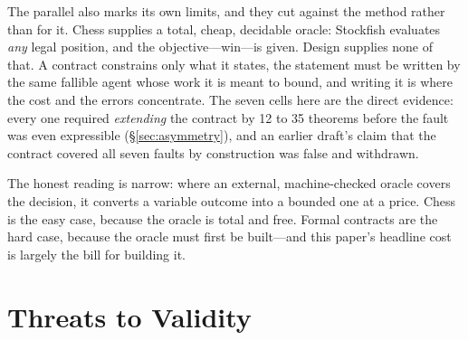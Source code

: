 \documentclass[runningheads]{llncs}
\begin{document}
The parallel also marks its own limits, and they cut against the method rather
than for it. Chess supplies a total, cheap, decidable oracle: Stockfish evaluates
\emph{any} legal position, and the objective---win---is given. Design supplies
none of that. A contract constrains only what it states, the statement must be
written by the same fallible agent whose work it is meant to bound, and writing
it is where the cost and the errors concentrate. The seven cells here are the
direct evidence: every one required \emph{extending} the contract by 12 to 35
theorems before the fault was even expressible (\S\ref{sec:asymmetry}), and an
earlier draft's claim that the contract covered all seven faults by construction
was false and withdrawn.

The honest reading is narrow: where an external, machine-checked oracle covers
the decision, it converts a variable outcome into a bounded one at a price. Chess
is the easy case, because the oracle is total and free. Formal contracts are the
hard case, because the oracle must first be built---and this paper's headline
cost is largely the bill for building it.

\section{Threats to Validity}\label{sec:threats}
\end{document}
